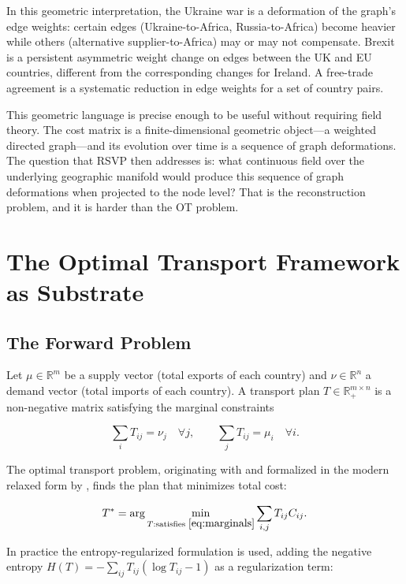 \documentclass[12pt]{article}
\newcommand{\Tij}{T_{ij}}
\newcommand{\Cij}{C_{ij}}
\begin{document}
In this geometric interpretation, the Ukraine war is a deformation of the graph's edge weights: certain edges (Ukraine-to-Africa, Russia-to-Africa) become heavier while others (alternative supplier-to-Africa) may or may not compensate. Brexit is a persistent asymmetric weight change on edges between the UK and EU countries, different from the corresponding changes for Ireland. A free-trade agreement is a systematic reduction in edge weights for a set of country pairs.

This geometric language is precise enough to be useful without requiring field theory. The cost matrix is a finite-dimensional geometric object---a weighted directed graph---and its evolution over time is a sequence of graph deformations. The question that RSVP then addresses is: what continuous field over the underlying geographic manifold would produce this sequence of graph deformations when projected to the node level? That is the reconstruction problem, and it is harder than the OT problem.

\section{The Optimal Transport Framework as Substrate}

\subsection{The Forward Problem}

Let $\mu \in \mathbb{R}^m$ be a supply vector (total exports of each country) and $\nu \in \mathbb{R}^n$ a demand vector (total imports of each country). A transport plan $T \in \mathbb{R}^{m \times n}_+$ is a non-negative matrix satisfying the marginal constraints

\begin{equation}
\sum_i \Tij = \nu_j \quad \forall j, \qquad \sum_j \Tij = \mu_i \quad \forall i.
\label{eq:marginals}
\end{equation}

The optimal transport problem, originating with \citet{monge1781} and formalized in the modern relaxed form by \citet{kantorovich1942}, finds the plan that minimizes total cost:

\begin{equation}
T^* = \arg\min_{T: \text{satisfies } \eqref{eq:marginals}} \sum_{i,j} \Tij \Cij.
\label{eq:ot_forward}
\end{equation}

In practice the entropy-regularized formulation is used, adding the negative entropy $H(T) = -\sum_{ij} \Tij(\log \Tij - 1)$ as a regularization term:
\end{document}
